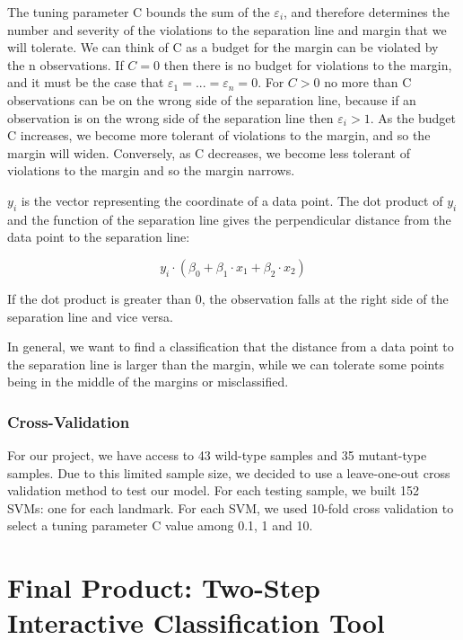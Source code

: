 \documentclass[10pt,letterpaper]{article}
\begin{document}
The tuning parameter C bounds the sum of the \(\varepsilon_i\), and
therefore determines the number and severity of the violations to the
separation line and margin that we will tolerate. We can think of C as a
budget for the margin can be violated by the n observations. If
\(C = 0\) then there is no budget for violations to the margin, and it
must be the case that \(\varepsilon_1 = . . . = \varepsilon_n = 0\). For
\(C > 0\) no more than C observations can be on the wrong side of the
separation line, because if an observation is on the wrong side of the
separation line then \(\varepsilon_i > 1\). As the budget C increases,
we become more tolerant of violations to the margin, and so the margin
will widen. Conversely, as C decreases, we become less tolerant of
violations to the margin and so the margin narrows.

\(y_i\) is the vector representing the coordinate of a data point. The
dot product of \(y_i\) and the function of the separation line gives the
perpendicular distance from the data point to the separation line:

\[y_i \cdot ( \beta_0 + \beta_1 \cdot x_1 + \beta_2 \cdot x_2 )\]

If the dot product is greater than 0, the observation falls at the right
side of the separation line and vice versa.

In general, we want to find a classification that the distance from a
data point to the separation line is larger than the margin, while we
can tolerate some points being in the middle of the margins or
misclassified.

\subsubsection{Cross-Validation}\label{cross-validation}

For our project, we have access to 43 wild-type samples and 35
mutant-type samples. Due to this limited sample size, we decided to use
a leave-one-out cross validation method to test our model. For each
testing sample, we built 152 SVMs: one for each landmark. For each SVM,
we used 10-fold cross validation to select a tuning parameter C value
among 0.1, 1 and 10.

\section{Final Product: Two-Step Interactive Classification
Tool}\label{final-product-two-step-interactive-classification-tool}
\end{document}
